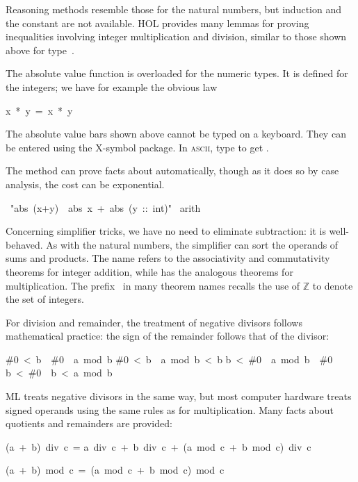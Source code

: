 Reasoning methods resemble those for the natural numbers, but induction and
the constant  are not available.  HOL provides many lemmas
for proving inequalities involving integer multiplication and division,
similar to those shown above for type~.  

The absolute value function  is overloaded for the numeric types.
It is defined for the integers; we have for example the obvious law
\begin{isabelle}
\isasymbar x\ *\ y\isasymbar \ =\ \isasymbar x\isasymbar \ *\ \isasymbar y\isasymbar 
{}
\end{isabelle}

\begin{warn}
The absolute value bars shown above cannot be typed on a keyboard.  They
can be entered using the X-symbol package.  In \textsc{ascii}, type  to
get .
\end{warn}

The  method can prove facts about  automatically, 
though as it does so by case analysis, the cost can be exponential.
\begin{isabelle}
\ "abs\ (x+y)\ \isasymle \ abs\ x\ +\ abs\ (y\ ::\ int)"\isanewline
{}\ arith
\end{isabelle}

Concerning simplifier tricks, we have no need to eliminate subtraction: it
is well-behaved.  As with the natural numbers, the simplifier can sort the
operands of sums and products.  The name  refers to the
associativity and commutativity theorems for integer addition, while
 has the analogous theorems for multiplication.  The
prefix~ in many theorem names recalls the use of $\mathbb{Z}$ to
denote the set of integers.

For division and remainder, the treatment of negative divisors follows
mathematical practice: the sign of the remainder follows that
of the divisor:
\begin{isabelle}
\#0\ <\ b\ \isasymLongrightarrow \ \#0\ \isasymle \ a\ mod\ b%
\isanewline
\#0\ <\ b\ \isasymLongrightarrow \ a\ mod\ b\ <\ b%
\isanewline
b\ <\ \#0\ \isasymLongrightarrow \ a\ mod\ b\ \isasymle \ \#0
\isanewline
b\ <\ \#0\ \isasymLongrightarrow \ b\ <\ a\ mod\ b%
\end{isabelle}
ML treats negative divisors in the same way, but most computer hardware
treats signed operands using the same rules as for multiplication.
Many facts about quotients and remainders are provided:
\begin{isabelle}
(a\ +\ b)\ div\ c\ =\isanewline
a\ div\ c\ +\ b\ div\ c\ +\ (a\ mod\ c\ +\ b\ mod\ c)\ div\ c%
\par\smallskip
(a\ +\ b)\ mod\ c\ =\ (a\ mod\ c\ +\ b\ mod\ c)\ mod\ c%
\end{isabelle}

